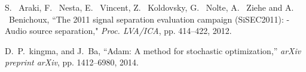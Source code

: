 \documentclass[honka]{nitkagawathesis}%
\begin{document}
\begin{thebibliography}{99}
  S. ~Araki, F. ~Nesta, E. ~Vincent, Z. ~Koldovsky, G. ~Nolte, A. ~Ziehe and A. ~Benichoux, ``The 2011 signal separation evaluation campaign (SiSEC2011): -Audio source separation," {\em Proc. LVA/ICA}, pp. 414--422, 2012.
  
  D.~P.~kingma, and J.~Ba, ``Adam: A method for stochastic optimization,''
  {\em arXiv preprint arXiv}, pp. 1412--6980, 2014.
  
\end{thebibliography}


% 



\appendix


\end{document}

